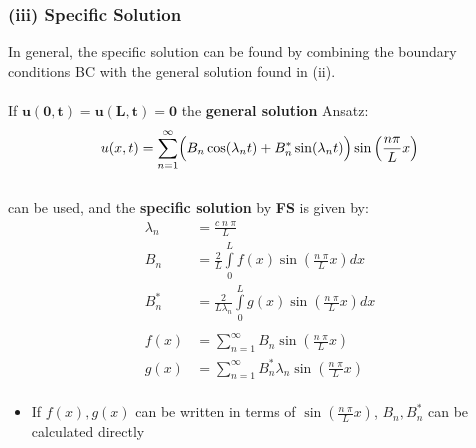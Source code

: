\subsubsection{(iii) Specific Solution}
In general, the specific solution can be found by combining the boundary conditions BC
with the general solution found in (ii).\\\\
If $\mathbf{u(0,t)=u(L,t)= 0}$ the \textbf{general solution} Ansatz:
\begin{equation*}
    u(x,t)=\sum\limits_{n=1}^{\infty}
    \Bigl( B_n \cos(\lambda _n t)+B_n^* \sin(\lambda_n t)\Bigr) \sin
    \left(\frac{n \pi}{L}x \right)
\end{equation*}\\
can be used, and the \textbf{specific solution} by \textbf{FS} is given by:
\begin{align*}
    \lambda_n & =\frac{c\; n\; \pi}{L}                                               \\
    B_n       & =\frac{2}{L}\int\limits_0^L f(x)\sin(\frac{n\;\pi}{L}x)dx            \\
    B_n^*     & =\frac{2}{L\lambda_n} \int\limits_0^L g(x) \sin(\frac{n\;\pi}{L}x)dx \\\\
    f(x)      & =\sum\limits_{n=1}^{\infty} B_n \sin(\frac{n\;\pi}{L}x)              \\
    g(x)      & =\sum\limits_{n=1}^{\infty} B_n^* \lambda_n \sin(\frac{n\;\pi}{L}x)  \\
\end{align*}
\begin{itemize}
    \item If $f(x),g(x)$ can be written in terms of $\sin(\frac{n\;\pi}{L}x)$, $B_n, B_n^*$
          can be calculated directly
\end{itemize}
%
%
